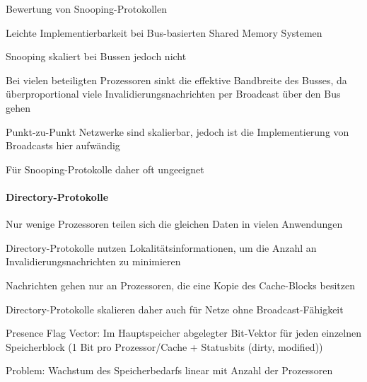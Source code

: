 \documentclass[10pt,landscape]{article}
\begin{document}
\begin{multicols}{3}
  Bewertung von Snooping-Protokollen
  \begin{itemize*}
    \item Leichte Implementierbarkeit bei Bus-basierten Shared Memory Systemen
    \item Snooping skaliert bei Bussen jedoch nicht
    \item Bei vielen beteiligten Prozessoren sinkt die effektive Bandbreite des Busses, da überproportional viele Invalidierungsnachrichten per Broadcast über den Bus gehen
    \item Punkt-zu-Punkt Netzwerke sind skalierbar, jedoch ist die Implementierung von Broadcasts hier aufwändig
    \item Für Snooping-Protokolle daher oft ungeeignet
  \end{itemize*}
  
  \paragraph{Directory-Protokolle}
  \begin{itemize*}
    \item Nur wenige Prozessoren teilen sich die gleichen Daten in vielen Anwendungen
    \item Directory-Protokolle nutzen Lokalitätsinformationen, um die Anzahl an Invalidierungsnachrichten zu minimieren
    \item Nachrichten gehen nur an Prozessoren, die eine Kopie des Cache-Blocks besitzen
    \item Directory-Protokolle skalieren daher auch für Netze ohne Broadcast-Fähigkeit
    \item Presence Flag Vector: Im Hauptspeicher abgelegter Bit-Vektor für jeden einzelnen Speicherblock (1 Bit pro Prozessor/Cache + Statusbits (dirty, modified))
    \item Problem: Wachstum des Speicherbedarfs linear mit Anzahl der Prozessoren
  \end{itemize*}
  
\end{multicols}
\end{document}
